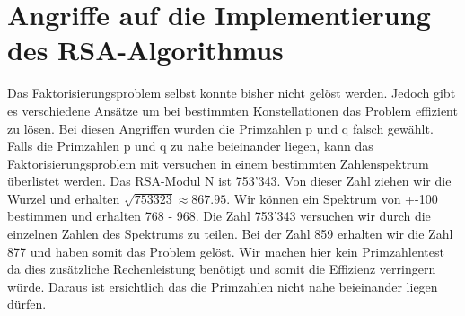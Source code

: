 \section{Angriffe auf die Implementierung des RSA-Algorithmus}
Das Faktorisierungsproblem selbst konnte bisher nicht gelöst werden. Jedoch gibt es verschiedene Ansätze um bei bestimmten Konstellationen das Problem effizient zu lösen. 
Bei diesen Angriffen wurden die Primzahlen p und q falsch gewählt.
Falls die Primzahlen p und q zu nahe beieinander liegen, kann das Faktorisierungsproblem mit versuchen in einem bestimmten Zahlenspektrum überlistet werden. Das RSA-Modul N ist 753'343. Von dieser Zahl ziehen wir die Wurzel und erhalten $ \sqrt{753323} \approx 867.95 $. Wir können  ein Spektrum von +-100 bestimmen und erhalten 768 - 968. Die Zahl 753'343 versuchen wir durch die einzelnen Zahlen des Spektrums zu teilen. Bei der Zahl 859 erhalten wir die Zahl 877 und haben somit das Problem gelöst. Wir machen hier kein Primzahlentest da dies zusätzliche Rechenleistung benötigt und somit die Effizienz verringern würde. Daraus ist ersichtlich das die Primzahlen nicht nahe beieinander liegen dürfen.%

